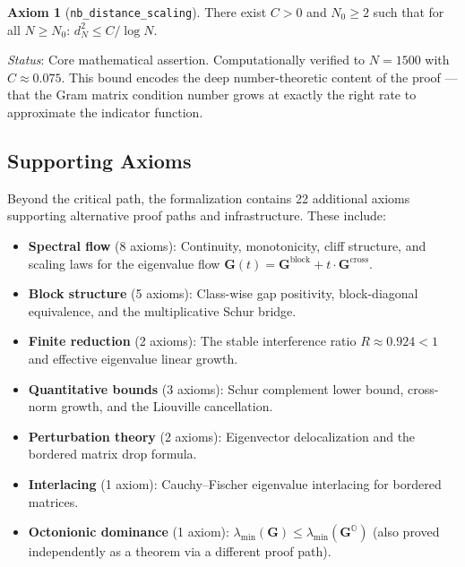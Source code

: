 \documentclass[11pt,a4paper]{article}
\theoremstyle{definition}
\newtheorem{axiombox}[theorem]{Axiom}
\theoremstyle{remark}
\newcommand{\Gram}{\mathbf{G}}
\newcommand{\Goct}{\mathbf{G}^{\mathbb{O}}}
\newcommand{\lmin}{\lambda_{\min}}
\newcommand{\lean}[1]{\texttt{#1}}
\begin{document}
\begin{axiombox}[\lean{nb\_distance\_scaling}]
There exist $C > 0$ and $N_0 \geq 2$ such that for all $N \geq N_0$:
$d_N^2 \leq C / \!\log N$.

\smallskip\noindent
\emph{Status}: Core mathematical assertion. Computationally verified to
$N = 1500$ with $C \approx 0.075$. This bound encodes the deep
number-theoretic content of the proof --- that the Gram matrix condition
number grows at exactly the right rate to approximate the indicator
function.
\end{axiombox}

\subsection{Supporting Axioms}

Beyond the critical path, the formalization contains 22 additional axioms
supporting alternative proof paths and infrastructure. These include:

\begin{itemize}
  \item \textbf{Spectral flow} (8 axioms): Continuity, monotonicity,
    cliff structure, and scaling laws for the eigenvalue flow
    $\Gram(t) = \Gram^{\mathrm{block}} + t \cdot \Gram^{\mathrm{cross}}$.

  \item \textbf{Block structure} (5 axioms): Class-wise gap positivity,
    block-diagonal equivalence, and the multiplicative Schur bridge.

  \item \textbf{Finite reduction} (2 axioms): The stable interference
    ratio $R \approx 0.924 < 1$ and effective eigenvalue linear growth.

  \item \textbf{Quantitative bounds} (3 axioms): Schur complement
    lower bound, cross-norm growth, and the Liouville cancellation.

  \item \textbf{Perturbation theory} (2 axioms): Eigenvector
    delocalization and the bordered matrix drop formula.

  \item \textbf{Interlacing} (1 axiom): Cauchy--Fischer eigenvalue
    interlacing for bordered matrices.

  \item \textbf{Octonionic dominance} (1 axiom): $\lmin(\Gram) \leq \lmin(\Goct)$
    (also proved independently as a theorem via a different proof path).
\end{itemize}
\end{document}
